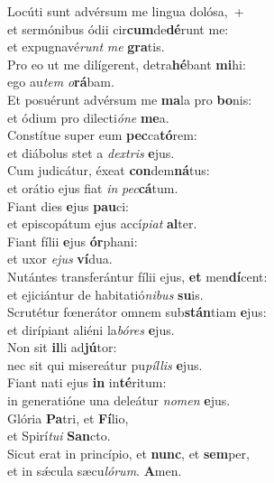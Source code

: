 \evenverse Locúti sunt advérsum me lingua dolósa,~+\\\evenverse  et sermónibus ódii cir\textbf{cum}de\textbf{dé}runt me:~\*\\
\evenverse et expugnavé\textit{runt} \textit{me} \textbf{gra}tis.\\
\oddverse Pro eo ut me dilígerent, detra\textbf{hé}bant \textbf{mi}hi:~\*\\
\oddverse ego au\textit{tem} \textit{o}\textbf{rá}bam.\\
\evenverse Et posuérunt advérsum me \textbf{ma}la pro \textbf{bo}nis:~\*\\
\evenverse et ódium pro dilecti\textit{ó}\textit{ne} \textbf{me}a.\\
\oddverse Constítue super eum \textbf{pec}ca\textbf{tó}rem:~\*\\
\oddverse et diábolus stet a \textit{dex}\textit{tris} \textbf{e}jus.\\
\evenverse Cum judicátur, éxeat \textbf{con}dem\textbf{ná}tus:~\*\\
\evenverse et orátio ejus fiat \textit{in} \textit{pec}\textbf{cá}tum.\\
\oddverse Fiant dies \textbf{e}jus \textbf{pau}ci:~\*\\
\oddverse et episcopátum ejus accí\textit{pi}\textit{at} \textbf{al}ter.\\
\evenverse Fiant fílii \textbf{e}jus \textbf{ór}phani:~\*\\
\evenverse et uxor \textit{e}\textit{jus} \textbf{ví}dua.\\
\oddverse Nutántes transferántur fílii ejus, \textbf{et} men\textbf{dí}cent:~\*\\
\oddverse et ejiciántur de habitatió\textit{ni}\textit{bus} \textbf{su}is.\\
\evenverse Scrutétur fœnerátor omnem sub\textbf{stán}tiam \textbf{e}jus:~\*\\
\evenverse et dirípiant aliéni la\textit{bó}\textit{res} \textbf{e}jus.\\
\oddverse Non sit \textbf{il}li ad\textbf{jú}tor:~\*\\
\oddverse nec sit qui misereátur pu\textit{píl}\textit{lis} \textbf{e}jus.\\
\evenverse Fiant nati ejus \textbf{in} in\textbf{té}ritum:~\*\\
\evenverse in generatióne una deleátur \textit{no}\textit{men} \textbf{e}jus.\\
\oddverse Glória \textbf{Pa}tri, et \textbf{Fí}lio,~\*\\
\oddverse et Spirí\textit{tu}\textit{i} \textbf{San}cto.\\
\evenverse Sicut erat in princípio, et \textbf{nunc}, et \textbf{sem}per,~\*\\
\evenverse et in sǽcula sæcu\textit{ló}\textit{rum}. \textbf{A}men.\\
